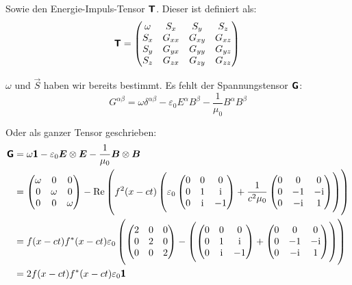 Sowie den Energie-Impuls-Tensor $\boldsymbol{\mathsf{T}}$. Dieser ist definiert als:
\[
	\boldsymbol{\mathsf{T}} = \begin{pmatrix}
		\omega & S_x & S_y & S_z \\
	 S_x & G_{xx} & G_{xy} & G_{xz} \\
  S_y & G_{yx} & G_{yy} & G_{yz} \\
  S_z & G_{zx} & G_{zy} & G_{zz} \\
	\end{pmatrix} \\
\]

$\omega$ und $\vec S$ haben wir bereits bestimmt. Es fehlt der Spannungstensor
$\boldsymbol{\mathsf{G}}$:
\[
	G^{\alpha\beta} = \omega \delta^{\alpha\beta} - \varepsilon_0 E^\alpha B^\beta - \frac{1}{\mu_0} B^\alpha B^\beta
\]

Oder als ganzer Tensor geschrieben:
\begin{align*}
	\tens G &= \omega \tens 1 - \varepsilon_0 \vec E \otimes \vec E - \frac{1}{\mu_0} \vec B \otimes \vec B \\
	&=
	\begin{pmatrix}
		\omega & 0 & 0 \\
				0 & \omega & 0 \\
		  0 & 0 & \omega
	\end{pmatrix}
	-
	\re\del{
		f^2(x-ct)
		\del{
			\varepsilon_0
			\begin{pmatrix}
				0 & 0 & 0 \\
		  0 & 1 & \ii \\
		  0 & \ii & -1
			\end{pmatrix}
			+
			\frac{1}{c^2 \mu_0}
			\begin{pmatrix}
				0 & 0 & 0 \\
		  0 & -1 & -\ii \\
		  0 & -\ii & 1
			\end{pmatrix}
		}
	} \\
	&=
	f(x-ct)f^*(x-ct) \varepsilon_0 \del{
		\begin{pmatrix}
			2 & 0 & 0 \\
			0 & 2 & 0 \\
			0 & 0 & 2
		\end{pmatrix}
		-
		\del{
			\begin{pmatrix}
				0 & 0 & 0 \\
		  0 & 1 & \ii \\
		  0 & \ii & -1
			\end{pmatrix}
			+
			\begin{pmatrix}
				0 & 0 & 0 \\
		  0 & -1 & -\ii \\
		  0 & -\ii & 1
			\end{pmatrix}
		}
	} \\
	&= 2 f(x-ct)f^*(x-ct) \varepsilon_0 \tens 1
\end{align*}

